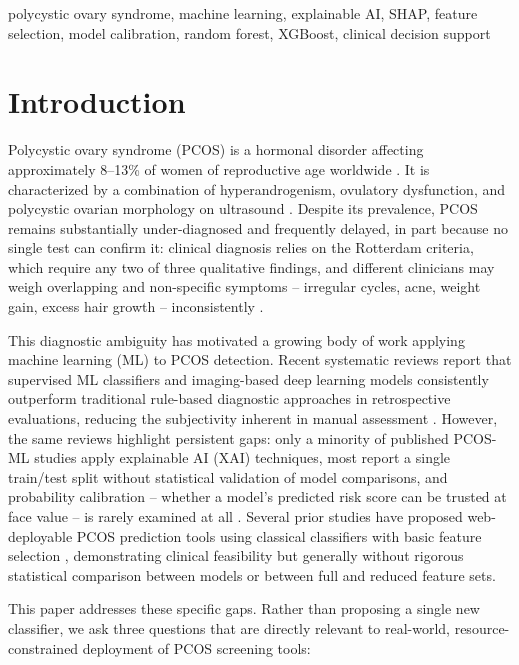 \documentclass[conference]{IEEEtran}
\begin{document}
\begin{IEEEkeywords}
polycystic ovary syndrome, machine learning, explainable AI, SHAP, feature selection, model calibration, random forest, XGBoost, clinical decision support
\end{IEEEkeywords}

\section{Introduction}

Polycystic ovary syndrome (PCOS) is a hormonal disorder affecting approximately 8--13\% of women of reproductive age worldwide \cite{ghaderzadeh2025}. It is characterized by a combination of hyperandrogenism, ovulatory dysfunction, and polycystic ovarian morphology on ultrasound \cite{rotterdam2004}. Despite its prevalence, PCOS remains substantially under-diagnosed and frequently delayed, in part because no single test can confirm it: clinical diagnosis relies on the Rotterdam criteria, which require any two of three qualitative findings, and different clinicians may weigh overlapping and non-specific symptoms -- irregular cycles, acne, weight gain, excess hair growth -- inconsistently \cite{rotterdam2004}.

This diagnostic ambiguity has motivated a growing body of work applying machine learning (ML) to PCOS detection. Recent systematic reviews report that supervised ML classifiers and imaging-based deep learning models consistently outperform traditional rule-based diagnostic approaches in retrospective evaluations, reducing the subjectivity inherent in manual assessment \cite{ghaderzadeh2025, barrera2023}. However, the same reviews highlight persistent gaps: only a minority of published PCOS-ML studies apply explainable AI (XAI) techniques, most report a single train/test split without statistical validation of model comparisons, and probability calibration -- whether a model's predicted risk score can be trusted at face value -- is rarely examined at all \cite{ghaderzadeh2025}. Several prior studies have proposed web-deployable PCOS prediction tools using classical classifiers with basic feature selection \cite{webbased2024, mohiuddin2025}, demonstrating clinical feasibility but generally without rigorous statistical comparison between models or between full and reduced feature sets.

This paper addresses these specific gaps. Rather than proposing a single new classifier, we ask three questions that are directly relevant to real-world, resource-constrained deployment of PCOS screening tools:
\end{document}
